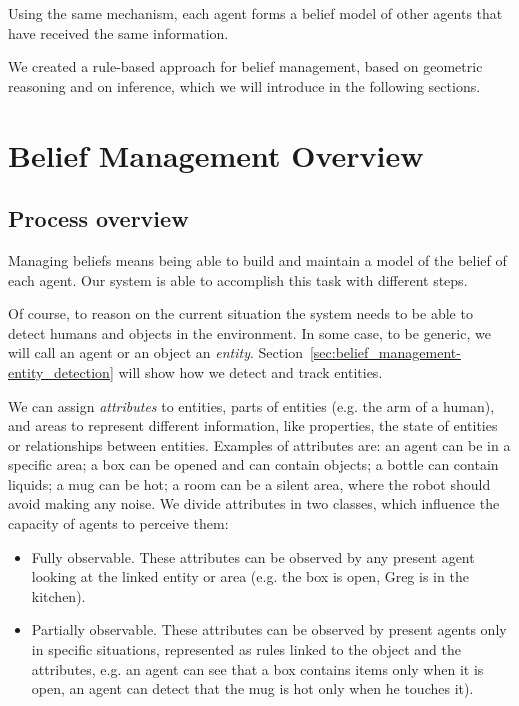 Using the same mechanism, each agent forms a belief model of other agents that have received the same information.

We created a rule-based approach for belief management, based on geometric reasoning and on inference, which we will introduce in the following sections. 

\section{Belief Management Overview}
\label{sec:belief_management-overview}

\subsection{Process overview}

Managing beliefs means being able to build and maintain a model of the belief of each agent. Our system is able to accomplish this task with different steps.

Of course, to reason on the current situation the system needs to be able to detect humans and objects in the environment. In some case, to be generic, we will call an agent or an object an \textit{entity}. Section~\ref{sec:belief_management-entity_detection} will show how we detect and track entities.

We can assign \textit{attributes} to entities, parts of entities (e.g. the arm of a human), and areas to represent different information, like properties, the state of entities or relationships between entities. Examples of attributes are:
an agent can be in a specific area; a box can be opened and can contain objects; a bottle can contain liquids; a mug can be hot; a room can be a silent area, where the robot should avoid making any noise.
We divide attributes in two classes, which influence the capacity of agents to perceive them: 
\begin{itemize}
\item Fully observable. These attributes can be observed by any present agent looking at the linked entity or area (e.g. the box is open, Greg is in the kitchen).
\item Partially observable. These attributes can be observed by present agents only in specific situations, represented as rules linked to the object and the attributes, e.g. an agent can see that a box contains items only when it is open, an agent can detect that the mug is hot only when he touches it). 
\end{itemize}


